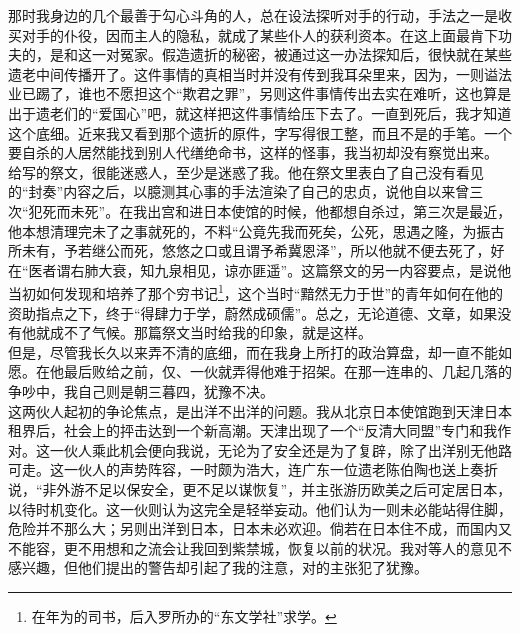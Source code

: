 那时我身边的几个最善于勾心斗角的人，总在设法探听对手的行动，手法之一是收买对手的仆役，因而主人的隐私，就成了某些仆人的获利资本。在这上面最肯下功夫的，是和这一对冤家。假造遗折的秘密，被通过这一办法探知后，很快就在某些遗老中间传播开了。这件事情的真相当时并没有传到我耳朵里来，因为，一则谥法业已踢了，谁也不愿担这个“欺君之罪”，另则这件事情传出去实在难听，这也算是出于遗老们的“爱国心”吧，就这样把这件事情给压下去了。一直到死后，我才知道这个底细。近来我又看到那个遗折的原件，字写得很工整，而且不是的手笔。一个要自杀的人居然能找到别人代缮绝命书，这样的怪事，我当初却没有察觉出来。\\

给写的祭文，很能迷惑人，至少是迷惑了我。他在祭文里表白了自己没有看见的“封奏”内容之后，以臆测其心事的手法渲染了自己的忠贞，说他自以来曾三次“犯死而未死”。在我出宫和进日本使馆的时候，他都想自杀过，第三次是最近，他本想清理完未了之事就死的，不料“公竟先我而死矣，公死，思遇之隆，为振古所未有，予若继公而死，悠悠之口或且谓予希冀恩泽”，所以他就不便去死了，好在“医者谓右肺大衰，知九泉相见，谅亦匪遥”。这篇祭文的另一内容要点，是说他当初如何发现和培养了那个穷书记\footnote{在年为的司书，后入罗所办的“东文学社”求学。}，这个当时“黯然无力于世”的青年如何在他的资助指点之下，终于“得肆力于学，蔚然成硕儒”。总之，无论道德、文章，如果没有他就成不了气候。那篇祭文当时给我的印象，就是这样。\\

但是，尽管我长久以来弄不清的底细，而在我身上所打的政治算盘，却一直不能如愿。在他最后败给之前，仅、一伙就弄得他难于招架。在那一连串的、几起几落的争吵中，我自己则是朝三暮四，犹豫不决。\\

这两伙人起初的争论焦点，是出洋不出洋的问题。我从北京日本使馆跑到天津日本租界后，社会上的抨击达到一个新高潮。天津出现了一个“反清大同盟”专门和我作对。这一伙人乘此机会便向我说，无论为了安全还是为了复辟，除了出洋别无他路可走。这一伙人的声势阵容，一时颇为浩大，连广东一位遗老陈伯陶也送上奏折说，“非外游不足以保安全，更不足以谋恢复”，并主张游历欧美之后可定居日本，以待时机变化。这一伙则认为这完全是轻举妄动。他们认为一则未必能站得住脚，危险并不那么大；另则出洋到日本，日本未必欢迎。倘若在日本住不成，而国内又不能容，更不用想和之流会让我回到紫禁城，恢复以前的状况。我对等人的意见不感兴趣，但他们提出的警告却引起了我的注意，对的主张犯了犹豫。\\


